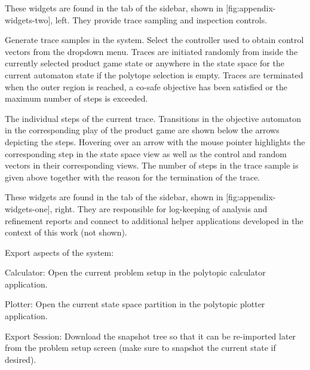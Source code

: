 \startsubject[title=Control Widgets]

    These widgets are found in the  tab of the sidebar, shown in [fig:appendix-widgets-two], left.
    They provide trace sampling and inspection controls.

    \startsubsubject[title={Widget: Sample Trace}]

        Generate trace samples in the system.
        Select the controller used to obtain control vectors from the dropdown menu.
        Traces are initiated randomly from inside the currently selected product game state or anywhere in the state space for the current automaton state if the polytope selection is empty.
        Traces are terminated when the outer region is reached, a co-safe objective has been satisfied or the maximum number of steps is exceeded.

    \stopsubsubject

    \startsubsubject[title={Widget: Trace}]

        The individual steps of the current trace.
        Transitions in the objective automaton in the corresponding play of the product game are shown below the arrows depicting the steps.
        Hovering over an arrow with the mouse pointer highlights the corresponding step in the state space view as well as the control and random vectors in their corresponding views.
        The number of steps in the trace sample is given above together with the reason for the termination of the trace.

    \stopsubsubject

\stopsubject


\startsubject[title=Info Widgets]

    These widgets are found in the  tab of the sidebar, shown in [fig:appendix-widgets-one], right.
    They are responsible for log-keeping of analysis and refinement reports and connect to additional helper applications developed in the context of this work (not shown).

    \startsubsubject[title={Widget: Connectivity}]

        Export aspects of the system:

        \startitemize[packed]
            \item{Calculator: Open the current problem setup in the polytopic calculator application.}
            \item{Plotter: Open the current state space partition in the polytopic plotter application.}
            \item{Export Session: Download the snapshot tree so that it can be re-imported later from the problem setup screen (make sure to snapshot the current state if desired).}
        \stopitemize

